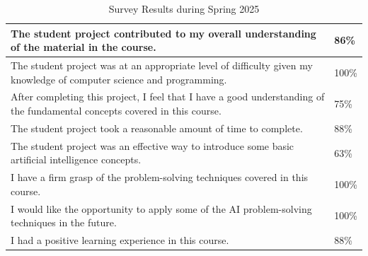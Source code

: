 \begin{table}
\scriptsize
  \centering
  \caption{Survey Results during Spring 2025 } \label{tab:survey}
  \begin{tabularx}{\textwidth}{|X|l|}
    \hline
    The student project contributed to my overall understanding of the material in the course.
 & 86\% \\
    \hline
    The student project was at an appropriate level of difficulty given my knowledge of computer science and programming. & 100\% \\
    \hline
    After completing this project, I feel that I have a good understanding of the fundamental concepts covered in this course. & 75\% \\
    \hline
    The student project took a reasonable amount of time to complete. & 88\% \\
    \hline
    The student project was an effective way to introduce some basic artificial intelligence concepts. & 63\% \\
    \hline
    I have a firm grasp of the problem-solving techniques covered in this course. & 100\% \\
    \hline
    I would like the opportunity to apply some of the AI problem-solving techniques in the future. & 100\% \\
    \hline 
    I had a positive learning experience in this course. & 88\% \\
    \hline
    
  \end{tabularx}
\end{table}
